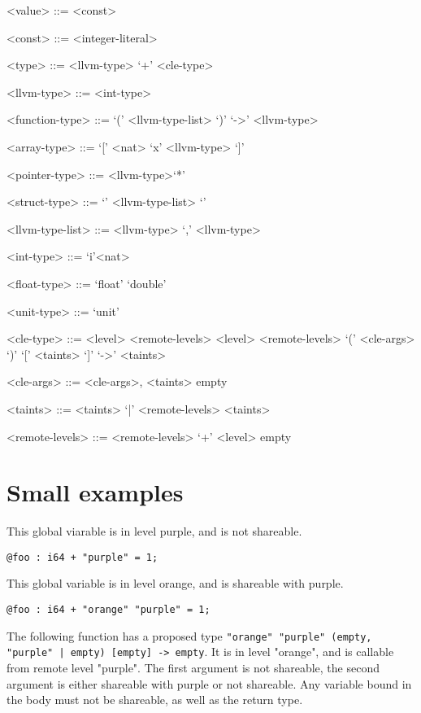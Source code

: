 \documentclass{article}
\begin{document}
\begin{grammar}
<value> ::= <const>

<const> ::= <integer-literal>

<type> ::= <llvm-type> `+' <cle-type>

<llvm-type> ::= <int-type>

<function-type> ::= `(' <llvm-type-list> `)' `->' <llvm-type>

<array-type> ::= `[' <nat> `x' <llvm-type> `]'

<pointer-type> ::= <llvm-type>`*'

<struct-type> ::= `{' <llvm-type-list> `}'

<llvm-type-list> ::= <llvm-type>
`,' <llvm-type>

<int-type> ::= `i'<nat>

<float-type> ::= `float' 
\alt `double'

<unit-type> ::= `unit'

<cle-type> ::= <level> <remote-levels> 
\alt <level> <remote-levels> `(' <cle-args> `)' `[' <taints> `]' `->' <taints> 

<cle-args> ::= <cle-args>, <taints> \alt empty

<taints> ::=  <taints> `|' <remote-levels> \alt <taints> 

<remote-levels> ::=  <remote-levels> `+' <level> \alt empty 

\end{grammar}

\section{Small examples}

This global viarable is in level purple, and is not shareable.
\begin{verbatim}
@foo : i64 + "purple" = 1;
\end{verbatim}


This global variable is in level orange, and is shareable with purple.
\begin{verbatim}
@foo : i64 + "orange" "purple" = 1;
\end{verbatim}

The following function has a proposed type \texttt{"orange" "purple" (empty, "purple" | empty) [empty] -> empty}.
It is in level "orange", and is callable from remote level "purple".
The first argument is not shareable, 
the second argument is either shareable with purple or not shareable. 
Any variable bound in the body must not be shareable, as well as the return type.
\end{document}
